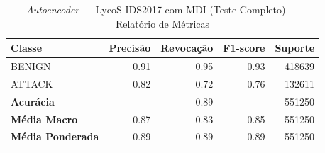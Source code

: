 \begin{table}[H]
    \centering
    \small
    \begin{tabular}{lrrrr}
        \hline
        Classe                   & Precisão & Revocação & F1-score & Suporte \\
        \hline
        BENIGN                   & 0.91     & 0.95      & 0.93     & 418639  \\
        ATTACK                   & 0.82     & 0.72      & 0.76     & 132611  \\
        \hline
        \textbf{Acurácia}        & -        & 0.89      & -        & 551250  \\
        \textbf{Média Macro}     & 0.87     & 0.83      & 0.85     & 551250  \\
        \textbf{Média Ponderada} & 0.89     & 0.89      & 0.89     & 551250  \\
        \hline
    \end{tabular}
    \caption{\textit{Autoencoder} — LycoS-IDS2017 com MDI (Teste Completo) — Relatório de Métricas}
    \label{table:ae_lycos_mdi_completo_metricas}
\end{table}
